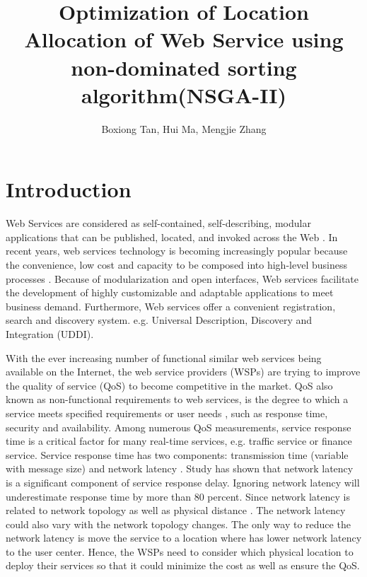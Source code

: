 \documentclass{llncs}
\title{
Optimization of Location Allocation of Web Service using non-dominated sorting algorithm(NSGA-II)
}
\author{Boxiong Tan, Hui Ma, Mengjie Zhang}
\institute{School of Engineering and Computer Science,
\\Victoria University of Wellington, New Zealand \\
\email{\{tanboxi, Hui.Ma, Mengjie.Zhang\}@ecs.vuw.ac.nz}}
\begin{document}
\maketitle

\begin{abstract}

\end{abstract}

\section{Introduction}
Web Services are considered as self-contained, self-describing, modular applications that can be published, located, and invoked across the Web \cite{Ran}. 
In recent years, web services technology is becoming increasingly popular because the convenience, low cost and capacity to be composed into high-level business processes \cite{Aboolian}.
Because of modularization and open interfaces, Web services facilitate the development of highly 
customizable and adaptable applications to meet business demand. Furthermore, Web services offer a 
convenient registration, search  and discovery system. e.g. Universal Description, Discovery and Integration (UDDI). 

With the ever increasing number of functional similar web services being available on the Internet, the web service providers (WSPs) are trying to improve the quality of service (QoS) to become competitive in the market.  
QoS also known as non-functional requirements to  web services, is the degree to which a service meets specified requirements or user needs \cite{4061431}, such as response time, security and availability. 
Among numerous QoS measurements, service response time is a critical factor for many real-time services, e.g. traffic service or finance service. 
Service response time has two components: transmission time (variable with message size) and network latency \cite{Johansson}. 
Study \cite{916684} has shown that network latency is a significant component of service response delay.
Ignoring network latency will underestimate response time by more than 80 percent. Since network latency is related to network topology as well as physical distance \cite{distanceMetrics}. 
The network latency could also vary with the network topology changes.
The only way to reduce the network latency is move the service to a location where has lower network latency to the user center. 
Hence, the WSPs need to consider which physical location to deploy their services so that it could minimize the cost as well as ensure the QoS.
\end{document}
